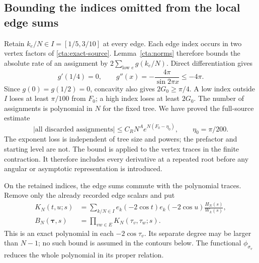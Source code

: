 \subsection{Bounding the indices omitted from the local edge sums}
Retain \(k_e/N\in I=[1/5,3/10]\) at every edge.
Each edge index occurs in two vertex factors of
\eqref{cta:exact-source}. Lemma~\ref{cta:norms} therefore bounds
the absolute rate of an assignment by
\(2\sum_{\text{low }e}g(k_e/N)\).
Direct differentiation gives
\[
 g'(1/4)=0,\qquad
 g''(x)=-\frac{4\pi}{\sin2\pi x}\le-4\pi.
\]
Since \(g(0)=g(1/2)=0\), concavity also gives \(2G_0\ge\pi/4\).
A low index outside \(I\) loses at least \(\pi/100\) from \(F_0\);
a high index loses at least \(2G_0\).
The number of assignments is polynomial in \(N\) for the fixed tree.
We have proved the full-source estimate
\begin{equation}\label{cta:discard}
 |\text{all discarded assignments}|
       \le C_R N^A e^{N(F_0-\eta_0)},\qquad \eta_0=\pi/200.
\end{equation}
The exponent loss is independent of tree size and powers; the
prefactor and starting level are not. The bound is applied to the vertex traces in the finite contraction.
It therefore includes every derivative at a repeated root before any
angular or asymptotic representation is introduced.

On the retained indices, the edge sums commute with the polynomial
traces. Remove only the already recorded edge scalars and put
\begin{equation}\label{cta:packet}
 \begin{split}
 K_N(t,u;s)&=\sum_{k/N\in I}e_k(-2\cos t)e_k(-2\cos u)
                         \frac{H_N(s)}{W_k(s)},\\
 B_N(\boldsymbol\tau,s)&=\prod_{vw\in E}K_N(\tau_v,\tau_w;s).
 \end{split}
\end{equation}
This is an exact polynomial in each \(-2\cos\tau_v\).
Its separate degree may be larger than \(N-1\); no such bound
is assumed in the contours below. The functional \(\phi_{\sigma_v}\)
reduces the whole polynomial in its proper relation.
